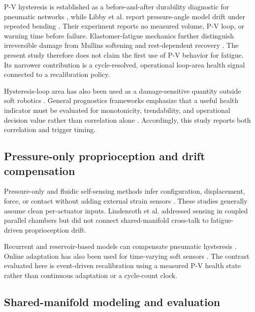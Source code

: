 \documentclass[preprints,article,submit,oneauthor]{Definitions/mdpi}
\begin{document}
P-V hysteresis is established as a before-and-after durability diagnostic for pneumatic networks \citep{mosadegh2014,mosadegh2020}, while Libby et al. report pressure-angle model drift under repeated bending \citep{libby2023}. Their experiment reports no measured volume, P-V loop, or warning time before failure. Elastomer-fatigue mechanics further distinguish irreversible damage from Mullins softening and rest-dependent recovery \citep{mars2002,lavazza2023,liao2021}. The present study therefore does not claim the first use of P-V behavior for fatigue. Its narrower contribution is a cycle-resolved, operational loop-area health signal connected to a recalibration policy.

Hysteresis-loop area has also been used as a damage-sensitive quantity outside soft robotics \citep{haghshenas2021,guo2021,galanopoulos2023}. General prognostics frameworks emphasize that a useful health indicator must be evaluated for monotonicity, trendability, and operational decision value rather than correlation alone \citep{scheffer2009,lei2018}. Accordingly, this study reports both correlation and trigger timing.

\subsection{Pressure-only proprioception and drift compensation}

Pressure-only and fluidic self-sensing methods infer configuration, displacement, force, or contact without adding external strain sensors \citep{wang2020,wang2023,wang2025,joshi2023,zou2024,preechayasomboon2021}. These studies generally assume clean per-actuator inputs. Lindenroth et al. \citep{lindenroth2023} addressed sensing in coupled parallel chambers but did not connect shared-manifold cross-talk to fatigue-driven proprioception drift.

Recurrent and reservoir-based models can compensate pneumatic hysteresis \citep{jaeger2004,youssef2022,shen2025}. Online adaptation has also been used for time-varying soft sensors \citep{thuruthel2022,kushawaha2025}. The contrast evaluated here is event-driven recalibration using a measured P-V health state rather than continuous adaptation or a cycle-count clock.

\subsection{Shared-manifold modeling and evaluation}
\end{document}
